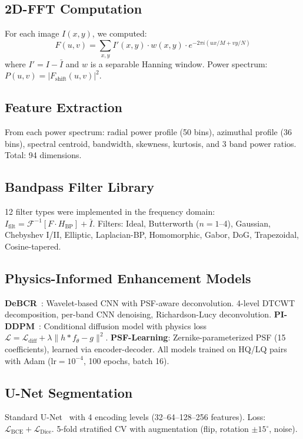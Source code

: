 \documentclass[11pt,a4paper]{article}
\begin{document}
\subsection{2D-FFT Computation}
For each image $I(x,y)$, we computed:
\begin{equation}
F(u,v) = \sum_{x,y} I'(x,y) \cdot w(x,y) \cdot e^{-2\pi i(ux/M + vy/N)}
\end{equation}
where $I' = I - \bar{I}$ and $w$ is a separable Hanning window. Power spectrum: $P(u,v) = |F_{\text{shift}}(u,v)|^2$.

\subsection{Feature Extraction}
From each power spectrum: radial power profile (50 bins), azimuthal profile (36 bins), spectral centroid, bandwidth, skewness, kurtosis, and 3 band power ratios. Total: 94 dimensions.

\subsection{Bandpass Filter Library}
12 filter types were implemented in the frequency domain: $I_{\text{filt}} = \mathcal{F}^{-1}[F \cdot H_{\text{BP}}] + \bar{I}$. Filters: Ideal, Butterworth ($n{=}1$--4), Gaussian, Chebyshev I/II, Elliptic, Laplacian-BP, Homomorphic, Gabor, DoG, Trapezoidal, Cosine-tapered.

\subsection{Physics-Informed Enhancement Models}
\textbf{DeBCR}~\cite{li2024debcr}: Wavelet-based CNN with PSF-aware deconvolution. 4-level DTCWT decomposition, per-band CNN denoising, Richardson-Lucy deconvolution. \textbf{PI-DDPM}~\cite{wang2024piddpm}: Conditional diffusion model with physics loss $\mathcal{L} = \mathcal{L}_{\text{diff}} + \lambda \|h * f_\theta - g\|^2$. \textbf{PSF-Learning}: Zernike-parameterized PSF (15 coefficients), learned via encoder-decoder. All models trained on HQ/LQ pairs with Adam ($\text{lr}{=}10^{-4}$, 100 epochs, batch 16).

\subsection{U-Net Segmentation}
Standard U-Net~\cite{ronneberger2015u} with 4 encoding levels (32--64--128--256 features). Loss: $\mathcal{L}_{\text{BCE}} + \mathcal{L}_{\text{Dice}}$. 5-fold stratified CV with augmentation (flip, rotation $\pm15^\circ$, noise).
\end{document}
